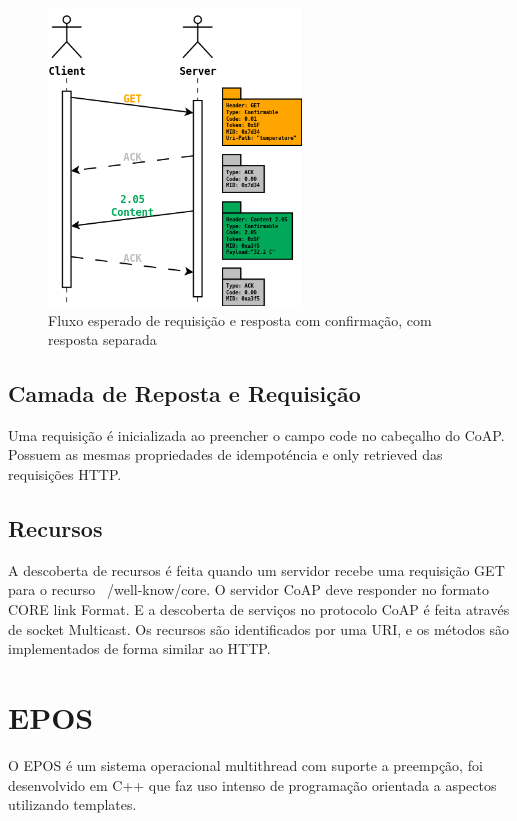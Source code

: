 \begin{figure}[h]
   \label{separateResponse}
   \centering
   \includegraphics[width=0.6\textwidth]{figuras/separateresponse.png}
   \caption{Fluxo esperado de requisi\c{c}\~ao e resposta com confirma\c{c}\~ao, com resposta separada}
\end{figure}

\subsection{Camada de Reposta e Requisi\c{c}\~ao}
Uma requisi\c{c}\~ao \'e inicializada ao preencher o campo code no cabe\c{c}alho do CoAP. Possuem as mesmas propriedades de idempot\'encia e only retrieved das requisi\c{c}\~oes HTTP.

\subsection{Recursos}
A descoberta de recursos \'e feita quando um servidor recebe uma requisi\c{c}\~ao GET para o recurso ~/well-know/core. O servidor CoAP deve responder no formato CORE link Format.\cite{rfc6690} E a descoberta de servi\c{c}os no protocolo CoAP \'e feita atrav\'es de socket Multicast. Os recursos s\~ao identificados por uma URI, e os m\'etodos s\~ao implementados de forma similar ao HTTP.



\section{EPOS}
O EPOS \'e um sistema operacional multithread com suporte a preemp\c{c}\~ao, foi desenvolvido em C++ que faz uso intenso de programa\c{c}\~ao orientada a aspectos utilizando templates.

